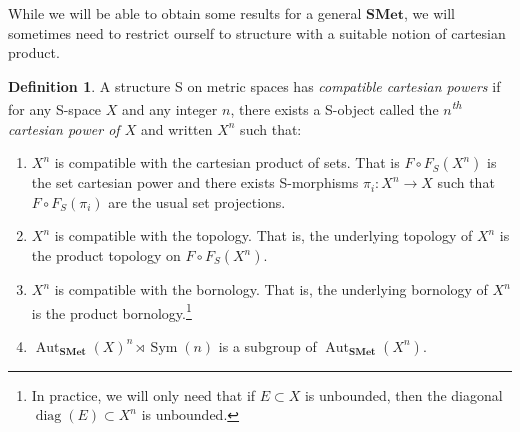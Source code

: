 \documentclass[a4paper]{article}
\theoremstyle{definition}
\newtheorem{defn}[lem]{Definition}
\DeclareMathOperator\Sym{Sym}
\DeclareMathOperator\diag{diag}
\DeclareMathOperator\Aut{Aut}
\DeclareMathOperator\id{id}
\newcommand*{\orbite}{\mathcal O}
\begin{document}
While we will be able to obtain some results for a general $\mathbf{SMet}$, we will sometimes need to restrict ourself to structure with a suitable notion of cartesian product.
%
%
\begin{defn}\label{Def:Cartesian}
A structure S on metric spaces has \emph{compatible cartesian powers} if for any S-space $X$ and any integer $n$, there exists a S-object called the \emph{$n$\textsuperscript{th} cartesian power of $X$} and written $X^n$ such that:
\begin{enumerate}
\item
$X^n$ is compatible with the cartesian product of sets. That is $F\circ F_S(X^n)$ is the set cartesian power and there exists S-morphisms $\pi_i\colon X^n\to X$ such that $F\circ F_S(\pi_i)$ are the usual set projections.
\item\label{Condidef:1}
$X^n$ is compatible with the topology. That is, the underlying topology of  $X^n$ is the product topology on $F\circ F_S(X^n)$.
\item\label{Condidef:2}
$X^n$ is compatible with the bornology. That is, the underlying bornology of $X^n$ is the product bornology.\footnote{In practice, we will only need that if $E\subset X$ is unbounded, then the diagonal $\diag(E)\subset X^n$ is unbounded.}
\item\label{Item:Product}
$\Aut_{\mathbf{SMet}}(X)^n\rtimes \Sym(n)$ is a subgroup of $\Aut_{\mathbf{SMet}}(X^n)$.
\end{enumerate}
%
\end{defn}
\end{document}
